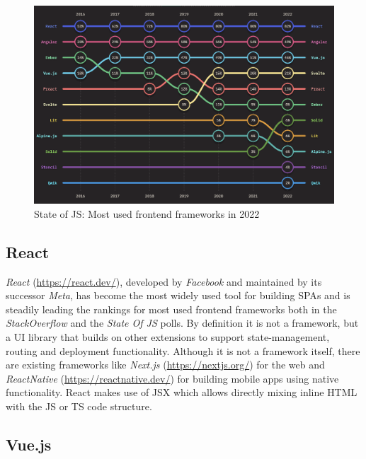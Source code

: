 \begin{figure}[h]
    \centering
    \includegraphics[scale=0.4]{04_Artefakte/01_Abbildungen/stateofjs-usage-frontend-frameworks-2022}
    \caption[{Most used frontend frameworks in 2022}]{State of JS: Most used frontend frameworks in 2022\protect\footnotemark}
    \label{fig:mostUsedFrameworks}
\end{figure}

\subsection{React}

\emph{React} (\url{https://react.dev/}), developed by \emph{Facebook} and maintained by its successor \emph{Meta}, has become the most widely used tool for building \ac{SPA}s and is steadily leading the rankings for most used frontend frameworks both in the \emph{StackOverflow} \parencite{stackOverflowPollWebFrameworks23} and the \emph{State Of JS} \parencite{mostUsedFrontendFrameworks22} polls. By definition it is not a framework, but a \ac{UI} library that builds on other extensions to support state-management, routing and deployment functionality. Although it is not a framework itself, there are existing frameworks like \emph{Next.js} (\url{https://nextjs.org/}) for the web and \emph{ReactNative} (\url{https://reactnative.dev/}) for building mobile apps using native functionality. React makes use of \ac{JSX} which allows directly mixing inline \ac{HTML} with the \ac{JS} or \ac{TS} code structure.

\subsection{Vue.js}

